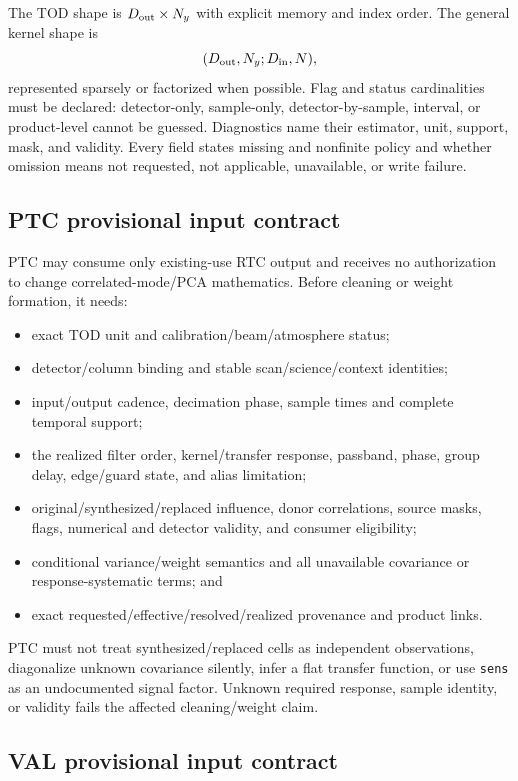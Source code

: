 \documentclass[11pt]{article}
\newcommand{\code}[1]{\nolinkurl{#1}}
\begin{document}
The TOD shape is $D_{\rm out}\times N_y$ with explicit memory and index order.
The general kernel shape is
\[
 (D_{\rm out},N_y;D_{\rm in},N),
\]
represented sparsely or factorized when possible.  Flag and status
cardinalities must be declared: detector-only,
sample-only, detector-by-sample, interval, or product-level cannot be guessed.
Diagnostics name their estimator, unit, support, mask, and validity.  Every
field states missing and nonfinite policy and whether omission means not requested,
not applicable, unavailable, or write failure.

\subsection{PTC provisional input contract}

PTC may consume only existing-use RTC output and receives no authorization to
change correlated-mode/PCA mathematics.  Before cleaning or weight formation,
it needs:

\begin{itemize}
\item exact TOD unit and calibration/beam/atmosphere status;
\item detector/column binding and stable scan/science/context identities;
\item input/output cadence, decimation phase, sample times and complete
      temporal support;
\item the realized filter order, kernel/transfer response, passband, phase,
      group delay, edge/guard state, and alias limitation;
\item original/synthesized/replaced influence, donor correlations, source
      masks, flags, numerical and detector validity, and consumer eligibility;
\item conditional variance/weight semantics and all unavailable covariance or
      response-systematic terms; and
\item exact requested/effective/resolved/realized provenance and product links.
\end{itemize}

PTC must not treat synthesized/replaced cells as independent observations,
diagonalize unknown covariance silently, infer a flat transfer function, or
use \code{sens} as an undocumented signal factor.  Unknown required response,
sample identity, or validity fails the affected cleaning/weight claim.

\subsection{VAL provisional input contract}
\end{document}
